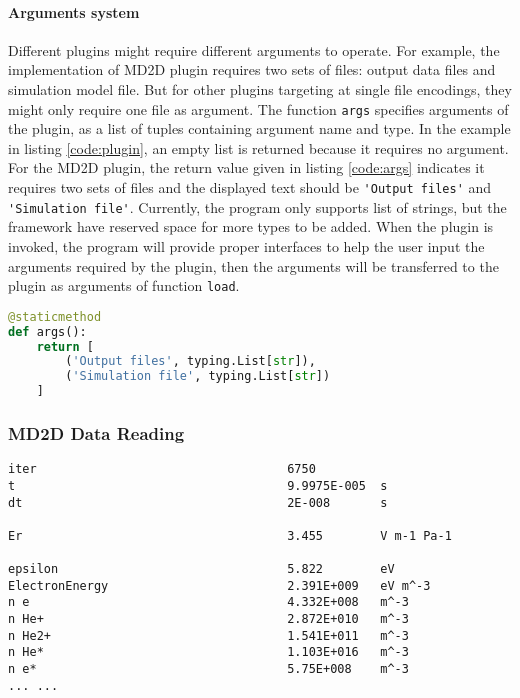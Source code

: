 \paragraph{Arguments system}

Different plugins might require different arguments to operate. For example, the implementation of MD2D plugin requires two sets of files: output data files and simulation model file. But for other plugins targeting at single file encodings, they might only require one file as argument. The function \lstinline{args} specifies arguments of the plugin, as a list of tuples containing argument name and type. In the example in listing \ref{code:plugin}, an empty list is returned because it requires no argument. For the MD2D plugin, the return value given in listing \ref{code:args} indicates it requires two sets of files and the displayed text should be \lstinline{'Output files'} and \lstinline{'Simulation file'}. Currently, the program only supports list of strings, but the framework have reserved space for more types to be added. When the plugin is invoked, the program will provide proper interfaces to help the user input the arguments required by the plugin, then the arguments will be transferred to the plugin as arguments of function \lstinline{load}.

\begin{lstlisting}[language = python, style = mybase, label = code:args,
	caption = Return value of MD2D plugin]
@staticmethod
def args():
    return [
		('Output files', typing.List[str]),
		('Simulation file', typing.List[str])
	]
\end{lstlisting}

\subsubsection{MD2D Data Reading} \label{sec:md2d}


\begin{lstfloat}[!tb]
	\begin{lstlisting}[style = mybase, label = code:info,
	caption = Example of infomation file]
iter                                   6750
t                                      9.9975E-005  s
dt                                     2E-008       s

Er                                     3.455        V m-1 Pa-1

epsilon                                5.822        eV
ElectronEnergy                         2.391E+009   eV m^-3
n e                                    4.332E+008   m^-3
n He+                                  2.872E+010   m^-3
n He2+                                 1.541E+011   m^-3
n He*                                  1.103E+016   m^-3
n e*                                   5.75E+008    m^-3
... ...
\end{lstlisting}
\end{lstfloat}

